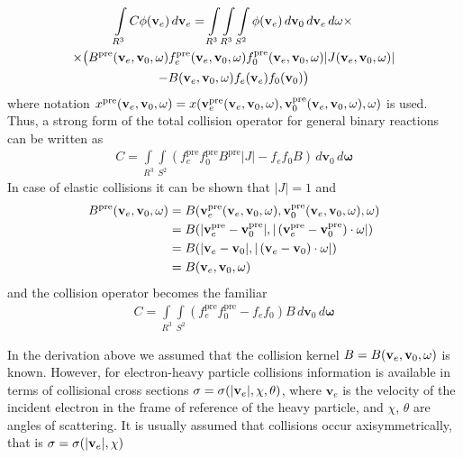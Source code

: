 \documentclass{article}
\newcommand{\myint}{\int\limits}
\newcommand{\diff}[1]{\, d#1}
\newcommand{\vect}[1]{\mathbf{#1}}
\newcommand{\of}[1]{\mleft( #1 \mright)}
\begin{document}
\begin{multline*}
\myint_{R^3} C \phi\of{\vect{v}_e} \diff{\vect{v}_e} 
=
\myint_{R^3} \myint_{R^3} \myint_{S^2} 
\phi\of{\vect{v}_e} 
\diff{\vect{v}_0} \diff{\vect{v}_e} \diff{\vect{\omega}}
\times
\\
\times
\big(
B^\text{pre}\of{\vect{v}_e, \vect{v}_0, \vect{\omega}}  
f_e^\text{pre}\of{\vect{v}_e, \vect{v}_0, \vect{\omega}}
f_0^\text{pre}\of{\vect{v}_e, \vect{v}_0, \vect{\omega}} 
|J\of{\vect{v}_e, \vect{v}_0, \vect{\omega}}|
\\
-
B\of{\vect{v}_e, \vect{v}_0, \vect{\omega}} 
f_e\of{\vect{v}_e} f_0\of{\vect{v}_0} 
\big)
\end{multline*}
where notation $x^\text{pre}\of{\vect{v}_e, \vect{v}_0, \vect{\omega}} = x\of{\vect{v}_e^\text{pre} \of{\vect{v}_e, \vect{v}_0, \vect{\omega}}, \vect{v}_0^\text{pre} \of{\vect{v}_e, \vect{v}_0, \vect{\omega}}, \vect{\omega}}$ is used. Thus, a strong form of the total collision operator for general binary reactions can be written as
\begin{align*}
C = 
\myint_{R^3} \myint_{S^2} 
\left(
f_e^\text{pre}
f_0^\text{pre}
B^\text{pre} 
|J|
-
f_e
f_0
B
\right)
\diff{\vect{v}_0} \diff{\vect{\omega}}
\end{align*}
In case of elastic collisions it can be shown that $|J| = 1$ and
\begin{align*}
B^\text{pre}\of{\vect{v}_e, \vect{v}_0, \vect{\omega}} &=
B\of{\vect{v}_e^\text{pre} \of{\vect{v}_e, \vect{v}_0, \vect{\omega}}, \vect{v}_0^\text{pre} \of{\vect{v}_e, \vect{v}_0, \vect{\omega}}, \vect{\omega}} 
\\
&=
B\of{|\vect{v}_e^\text{pre}- \vect{v}_0^\text{pre}|, |\left(\vect{v}_e^\text{pre}- \vect{v}_0^\text{pre}\right)\cdot\vect{\omega}|} 
\\
&=
B\of{|\vect{v}_e- \vect{v}_0|, |\left(\vect{v}_e- \vect{v}_0\right)\cdot\vect{\omega}|}
\\
&=
B\of{\vect{v}_e, \vect{v}_0, \vect{\omega}} 
\end{align*}
and the collision operator becomes the familiar
\begin{align*}
C = 
\myint_{R^3} \myint_{S^2} 
\left(
f_e^\text{pre}
f_0^\text{pre}
-
f_e
f_0
\right)
B
\diff{\vect{v}_0} \diff{\vect{\omega}}
\end{align*}

\clearpage
In the derivation above we assumed that the collision kernel $B=B\of{\vect{v}_e, \vect{v}_0, \vect{\omega}}$ is known. However, for electron-heavy particle collisions information is available in terms of collisional cross sections $\sigma = \sigma\of{|\vect{v}_e|, \chi, \theta}$, where $\vect{v}_e$ is the velocity of the incident electron in the frame of reference of the heavy particle, and $\chi$, $\theta$ are angles of scattering. It is usually assumed that collisions occur axisymmetrically, that is $\sigma = \sigma\of{|\vect{v}_e|, \chi}$
\end{document}
